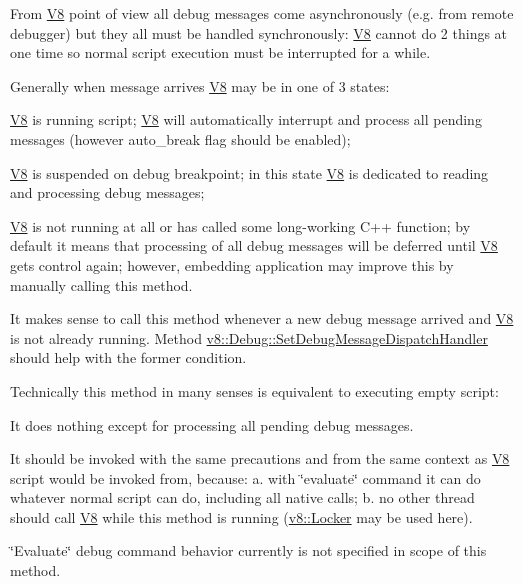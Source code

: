 From \hyperlink{classv8_1_1_v8}{V8} point of view all debug messages come asynchronously (e.\+g. from remote debugger) but they all must be handled synchronously\+: \hyperlink{classv8_1_1_v8}{V8} cannot do 2 things at one time so normal script execution must be interrupted for a while.

Generally when message arrives \hyperlink{classv8_1_1_v8}{V8} may be in one of 3 states\+:
\begin{DoxyEnumerate}
\item \hyperlink{classv8_1_1_v8}{V8} is running script; \hyperlink{classv8_1_1_v8}{V8} will automatically interrupt and process all pending messages (however auto\+\_\+break flag should be enabled);
\item \hyperlink{classv8_1_1_v8}{V8} is suspended on debug breakpoint; in this state \hyperlink{classv8_1_1_v8}{V8} is dedicated to reading and processing debug messages;
\item \hyperlink{classv8_1_1_v8}{V8} is not running at all or has called some long-\/working C++ function; by default it means that processing of all debug messages will be deferred until \hyperlink{classv8_1_1_v8}{V8} gets control again; however, embedding application may improve this by manually calling this method.
\end{DoxyEnumerate}

It makes sense to call this method whenever a new debug message arrived and \hyperlink{classv8_1_1_v8}{V8} is not already running. Method \hyperlink{classv8_1_1_debug_a5147f6cfeb9b87a67630b8c959996e9c}{v8\+::\+Debug\+::\+Set\+Debug\+Message\+Dispatch\+Handler} should help with the former condition.

Technically this method in many senses is equivalent to executing empty script\+:
\begin{DoxyEnumerate}
\item It does nothing except for processing all pending debug messages.
\item It should be invoked with the same precautions and from the same context as \hyperlink{classv8_1_1_v8}{V8} script would be invoked from, because\+: a. with \char`\"{}evaluate\char`\"{} command it can do whatever normal script can do, including all native calls; b. no other thread should call \hyperlink{classv8_1_1_v8}{V8} while this method is running (\hyperlink{classv8_1_1_locker}{v8\+::\+Locker} may be used here).
\end{DoxyEnumerate}

\char`\"{}\+Evaluate\char`\"{} debug command behavior currently is not specified in scope of this method. \hypertarget{classv8_1_1_debug_a5147f6cfeb9b87a67630b8c959996e9c}{}
